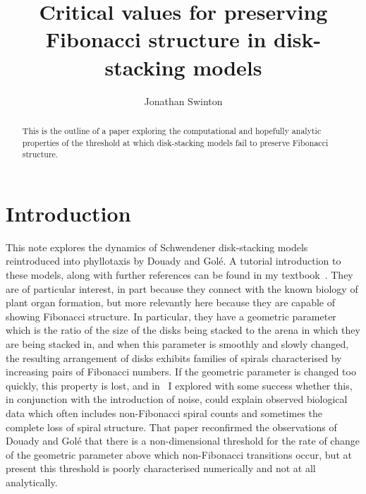 \documentclass[a4paper,10pt]{amsart}
\begin{document}
\title[Critical values]{Critical values for preserving Fibonacci structure in disk-stacking models} 
\author{Jonathan Swinton}
\address{ORCID 0000-0002-3196-9653}


\newpage

\begin{abstract}
This is the outline of a paper exploring the computational and hopefully analytic properties of the threshold at which disk-stacking models fail to preserve Fibonacci structure.

\end{abstract}
\maketitle 

 \section{Introduction}
This note explores the dynamics of Schwendener disk-stacking models reintroduced into phyllotaxis by Douady and Golé. A tutorial introduction to these models, along with further references can be found in my textbook~\cite{swintonMathematicalPhyllotaxis2025}. They are of particular interest, in part because they connect with the known biology of plant organ formation, but more relevantly here because they are capable of showing Fibonacci structure. In particular, they have a geometric parameter which is the ratio of the size of the disks being stacked to the arena in which they are being stacked in, and when this parameter is smoothly and slowly changed, the resulting arrangement of disks exhibits families of spirals characterised by increasing pairs of Fibonacci numbers. If the geometric parameter is changed too quickly, this property is lost, and in~\cite{swintonDiskstackingModelsAre2024} I explored 
  with some success whether this, in conjunction with the introduction of noise, could explain observed biological data which often includes non-Fibonacci spiral counts and sometimes the complete loss of spiral structure.
 That paper reconfirmed the observations of Douady and Golé that there is a non-dimensional threshold for the rate of change of the geometric parameter above which non-Fibonacci transitions occur, but at present this threshold is poorly characterised numerically and not at all analytically. 
 
  
 
\end{document}
